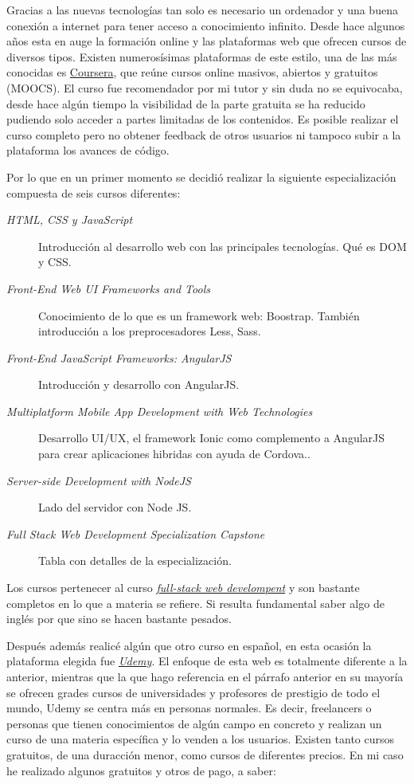 Gracias a las nuevas tecnologías tan solo es necesario un ordenador y una buena conexión a internet para tener acceso a conocimiento infinito. Desde hace algunos años esta en auge la formación online y las plataformas web que ofrecen cursos de diversos tipos. Existen numerosísimas plataformas de este estilo, una de las más conocidas es  \hyperlink{www.coursera.org}{Coursera}, que reúne cursos online masivos, abiertos y gratuitos (MOOCS). El curso fue recomendador por mi tutor y sin duda no se equivocaba, desde hace algún tiempo la visibilidad de la parte gratuita se ha reducido pudiendo solo acceder a partes limitadas de los contenidos. Es posible realizar el curso completo pero no obtener feedback de otros usuarios ni tampoco subir a la plataforma los avances de código.

Por lo que en un primer momento se decidió realizar la siguiente especialización compuesta de seis cursos diferentes:

\begin{description}
	\item[\emph{HTML, CSS y JavaScript}] Introducción al desarrollo web con las principales tecnologías. Qué es DOM y CSS.
	\item[ \emph{Front-End Web UI Frameworks and Tools}] Conocimiento de lo que es un framework web: Boostrap. También introducción a los preprocesadores Less, Sass.
	\item[\emph{Front-End JavaScript Frameworks: AngularJS} ]  Introducción y desarrollo con AngularJS.
	\item[ \emph{Multiplatform Mobile App Development with Web Technologies}] Desarrollo UI/UX, el framework Ionic como complemento a AngularJS para  crear aplicaciones hibridas con ayuda de Cordova..
	\item[ \emph{Server-side Development with NodeJS} ] Lado del servidor con Node JS.
	\item[ \emph{Full Stack Web Development Specialization Capstone}] Tabla con detalles de la especialización.
\end{description}


Los cursos pertenecer al curso \hyperlink{https://www.coursera.org/specializations/full-stack}{\emph{full-stack web develompent}} y son bastante completos en lo que a materia se refiere. Si resulta fundamental saber algo de inglés por que sino se hacen bastante pesados.

Después además realicé algún que otro curso en español, en esta ocasión la plataforma elegida fue  \hyperlink{https://www.udemy.com/}{\emph{Udemy}}. El enfoque de esta web es totalmente diferente a la anterior, mientras que la que hago referencia en el párrafo anterior en su mayoría se ofrecen grades cursos de universidades y profesores de prestigio de todo el mundo, Udemy se centra más en personas normales. Es decir, freelancers o personas que tienen conocimientos de algún campo en concreto y realizan un curso de una materia específica y lo venden a los usuarios. Existen tanto cursos gratuitos, de una duracción menor, como cursos de diferentes precios. En mi caso he realizado algunos gratuitos y otros de pago, a saber:  

